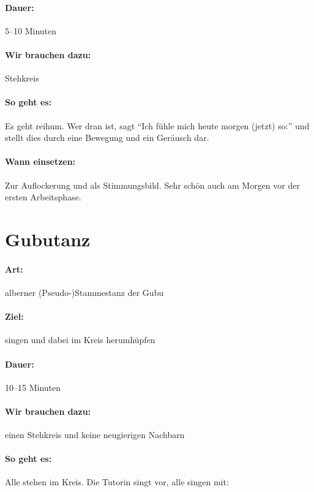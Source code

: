 \paragraph{Dauer:} 5--10 Minuten
\paragraph{Wir brauchen dazu:} Stehkreis
\paragraph{So geht es:} Es geht reihum. Wer dran ist, sagt "`Ich fühle mich heute morgen (jetzt) so:"' und stellt dies durch eine Bewegung und ein Geräusch dar.
\paragraph{Wann einsetzen:} Zur Auflockerung und als Stimmungsbild. Sehr schön auch am Morgen vor der ersten Arbeitsphase.

\section{Gubutanz}
\paragraph{Art:} alberner (Pseudo-)Stammestanz der Gubu
\paragraph{Ziel:} singen und dabei im Kreis herumhüpfen
\paragraph{Dauer:} 10--15 Minuten
\paragraph{Wir brauchen dazu:} einen Stehkreis und keine neugierigen Nachbarn
\paragraph{So geht es:} Alle stehen im Kreis. Die Tutorin singt vor, alle singen mit:


